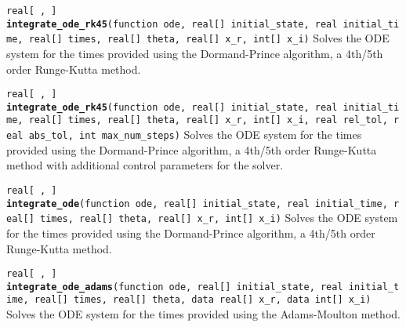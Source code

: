 \documentclass[
  10pt,
]{book}
\begin{document}

\texttt{real{[}\ ,\ {]}} \textbf{\texttt{integrate\_ode\_rk45}}\texttt{(function\ ode,\ real{[}{]}\ initial\_state,\ real\ initial\_time,\ real{[}{]}\ times,\ real{[}{]}\ theta,\ real{[}{]}\ x\_r,\ int{[}{]}\ x\_i)}\newline
Solves the ODE system for the times provided using the Dormand-Prince
algorithm, a 4th/5th order Runge-Kutta method.


\texttt{real{[}\ ,\ {]}} \textbf{\texttt{integrate\_ode\_rk45}}\texttt{(function\ ode,\ real{[}{]}\ initial\_state,\ real\ initial\_time,\ real{[}{]}\ times,\ real{[}{]}\ theta,\ real{[}{]}\ x\_r,\ int{[}{]}\ x\_i,\ real\ rel\_tol,\ real\ abs\_tol,\ int\ max\_num\_steps)}\newline
Solves the ODE system for the times provided using the Dormand-Prince
algorithm, a 4th/5th order Runge-Kutta method with additional control
parameters for the solver.


\texttt{real{[}\ ,\ {]}} \textbf{\texttt{integrate\_ode}}\texttt{(function\ ode,\ real{[}{]}\ initial\_state,\ real\ initial\_time,\ real{[}{]}\ times,\ real{[}{]}\ theta,\ real{[}{]}\ x\_r,\ int{[}{]}\ x\_i)}\newline
Solves the ODE system for the times provided using the Dormand-Prince
algorithm, a 4th/5th order Runge-Kutta method.


\texttt{real{[}\ ,\ {]}} \textbf{\texttt{integrate\_ode\_adams}}\texttt{(function\ ode,\ real{[}{]}\ initial\_state,\ real\ initial\_time,\ real{[}{]}\ times,\ real{[}{]}\ theta,\ data\ real{[}{]}\ x\_r,\ data\ int{[}{]}\ x\_i)}\newline
Solves the ODE system for the times provided using the Adams-Moulton method.
\end{document}

